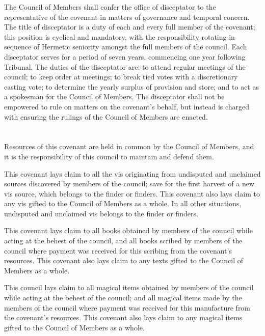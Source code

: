 \documentclass [a4paper,portrait]{article}
\begin{document}
\begin{multicols}{2}
\begin{small}
	The Council of Members shall confer the office of disceptator to the representative of the covenant in
	matters of governance and temporal concern. The title of disceptator is a duty of each and every full
	member of the covenant; this position is cyclical and mandatory, with the responsibility rotating in
	sequence of Hermetic seniority amongst the full members of the council. Each disceptator serves for a
	period of seven years, commencing one year following Tribunal. The duties of the disceptator are: to
	attend regular meetings of the council; to keep order at meetings; to break tied votes with a
	discretionary casting vote; to determine the yearly surplus of provision and store; and to act as a
	spokesman for the Council of Members. The disceptator shall not be empowered to rule on matters on the
	covenant's behalf, but instead is charged with ensuring the rulings of the Council of Members are
	enacted.
	
\section*{\fontsize{30}{35}\selectfont{Resources Owned by this Covenant}}
	Resources of this covenant are held in common by the Council of Members, and it is the responsibility
	of this council to maintain and defend them.
	
	This covenant lays claim to all the vis originating from undisputed and unclaimed sources discovered by
	members of the council; save for the first harvest of a new vis source, which belongs to the finder or
	finders. This covenant also lays claim to any vis gifted to the Council of Members as a whole. In all
	other situations, undisputed and unclaimed vis belongs to the finder or finders.
	
	This covenant lays claim to all books obtained by members of the council while acting at the behest of
	the council, and all books scribed by members of the council where payment was received for this
	scribing from the covenant's resources. This covenant also lays claim to any texts gifted to the Council
	of Members as a whole.
	
	This council lays claim to all magical items obtained by members of the council while acting at the
	behest of the council; and all magical items made by the members of the council where payment was
	received for this manufacture from the covenant's resources. This covenant also lays claim to any
	magical items gifted to the Council of Members as a whole.
	

\end{small}
\end{multicols}
\end{document}

